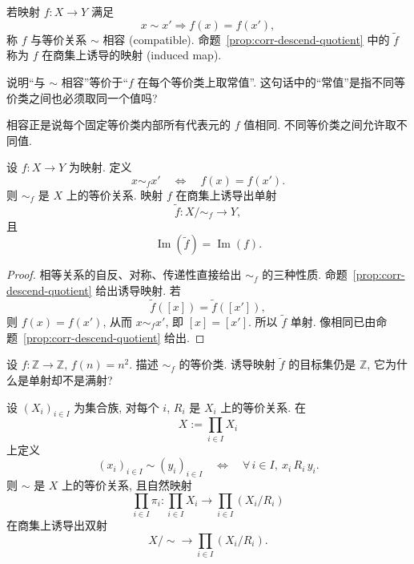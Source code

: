 \documentclass[usesamecnt, thmcnt=section, lang=cn, newtx, 10pt, scheme=chinese]{elegantbook}
\begin{document}
\begin{definition}[与等价关系相容]\label{def:corr-compatible}
若映射 $f:X\to Y$ 满足
\[
 x\sim x'\Rightarrow f(x)=f(x'),
\]
称 $f$ 与等价关系 $\sim$ {\color{blue}相容 (compatible)}. 命题~\ref{prop:corr-descend-quotient} 中的 $\widetilde f$ 称为 $f$ 在商集上{\color{blue}诱导的映射 (induced map)}.
\end{definition}

\begin{concept}\label{con:corr-17}
说明``与 $\sim$ 相容''等价于``$f$ 在每个等价类上取常值''. 这句话中的``常值''是指不同等价类之间也必须取同一个值吗?
\end{concept}

\begin{solution}
相容正是说每个固定等价类内部所有代表元的 $f$ 值相同. 不同等价类之间允许取不同值.
\end{solution}

\begin{corollary}\label{cor:corr-fiber-equivalence}
设 $f:X\to Y$ 为映射. 定义
\[
 x\sim_f x'
 \quad\Leftrightarrow\quad
 f(x)=f(x').
\]
则 $\sim_f$ 是 $X$ 上的等价关系. 映射 $f$ 在商集上诱导出单射
\[
 \widetilde f:X/{\sim_f}\longrightarrow Y,
\]
且
\[
 \operatorname{Im}(\widetilde f)=\operatorname{Im}(f).
\]
\end{corollary}

\begin{proof}
相等关系的自反、对称、传递性直接给出 $\sim_f$ 的三种性质. 命题~\ref{prop:corr-descend-quotient} 给出诱导映射. 若
\[
 \widetilde f([x])=\widetilde f([x']),
\]
则 $f(x)=f(x')$, 从而 $x\sim_f x'$, 即 $[x]=[x']$. 所以 $\widetilde f$ 单射. 像相同已由命题~\ref{prop:corr-descend-quotient} 给出.
\end{proof}

\begin{exercise}\label{ex:corr-fiber-equivalence}
设 $f:\mathbb Z\to\mathbb Z$, $f(n)=n^2$. 描述 $\sim_f$ 的等价类. 诱导映射 $\widetilde f$ 的目标集仍是 $\mathbb Z$, 它为什么是单射却不是满射?
\end{exercise}

\begin{corollary}\label{cor:corr-product-quotient}
设 $(X_i)_{i\in I}$ 为集合族, 对每个 $i$, $R_i$ 是 $X_i$ 上的等价关系. 在
\[
 X:=\prod_{i\in I}X_i
\]
上定义
\[
 (x_i)_{i\in I}\sim(y_i)_{i\in I}
 \quad\Leftrightarrow\quad
 \forall\,i\in I,\ x_i\,R_i\,y_i.
\]
则 $\sim$ 是 $X$ 上的等价关系, 且自然映射
\[
 \prod_{i\in I}\pi_i:
 \prod_{i\in I}X_i\longrightarrow
 \prod_{i\in I}(X_i/R_i)
\]
在商集上诱导出双射
\[
 X/{\sim}\longrightarrow\prod_{i\in I}(X_i/R_i).
\]
\end{corollary}
\end{document}

